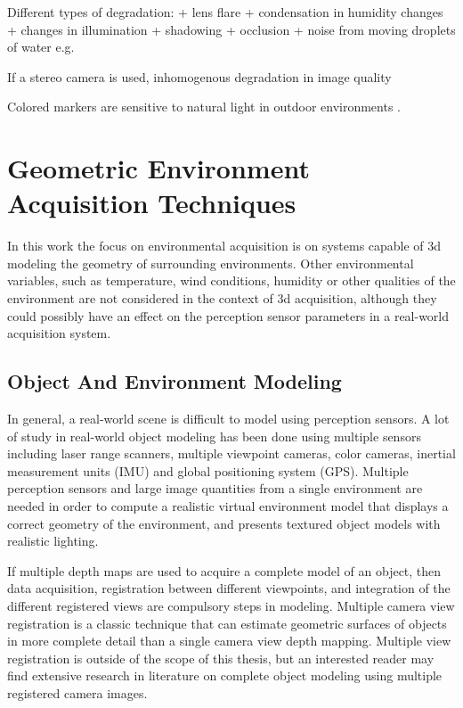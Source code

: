 \documentclass[12pt,a4paper,oneside,pdftex]{report}
\begin{document}
{Different types of degradation:
    + lens flare
    + condensation in humidity changes
    + changes in illumination
    + shadowing
    + occlusion
    + noise from moving droplets of water e.g.

If a stereo camera is used, inhomogenous degradation in image quality


Colored markers are sensitive to natural light in outdoor environments \cite{Kawai12}.

\section{Geometric Environment Acquisition Techniques}
\label{section:environment_acquisition_techniques}

In this work the focus on environmental acquisition is on systems capable of 3d modeling the geometry of surrounding environments. Other environmental variables, such as temperature, wind conditions, humidity or other qualities of the environment are not considered in the context of 3d acquisition, although they could possibly have an effect on the perception sensor parameters in a real-world acquisition system. 

\subsection{Object And Environment Modeling}
\label{subsection:object_and_environment_modeling}

In general, a real-world scene is difficult to model using perception sensors. A lot of study in real-world object modeling has been done using multiple sensors including laser range scanners, multiple viewpoint cameras, color cameras, inertial measurement units (IMU) and global positioning system (GPS). Multiple perception sensors and large image quantities from a single environment are needed in order to compute a realistic virtual environment model that displays a correct geometry of the environment, and presents textured object models with realistic lighting. \citep{ElHakim98}

If multiple depth maps are used to acquire a complete model of an object, then data acquisition, registration between different viewpoints, and integration of the different registered views are compulsory steps in modeling.  Multiple camera view registration is a classic technique that can estimate geometric surfaces of objects in more complete detail than a single camera view depth mapping. Multiple view registration is outside of the scope of this thesis, but an interested reader may find extensive research in literature on complete object modeling using multiple registered camera images. \citep{Chen91}

}
\end{document}
